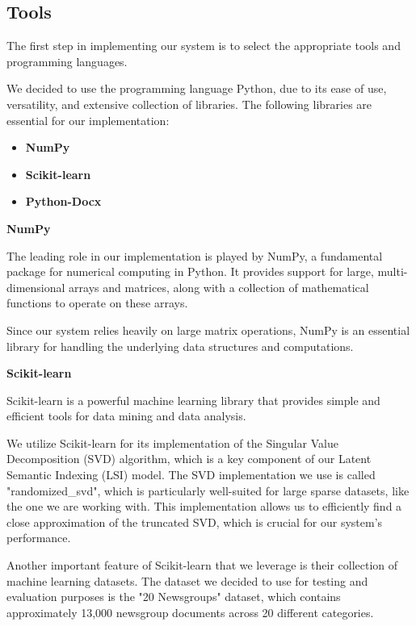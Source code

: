 \documentclass[12pt,a4paper]{article}
\begin{document}
    \subsection{Tools}
    The first step in implementing our system is to select the appropriate tools and programming languages. 
    
    We decided to use the programming language Python, due to its ease of use, versatility, and extensive collection of libraries. The following libraries are essential for our implementation:

    \begin{itemize}
        \item \textbf{NumPy}
        \item \textbf{Scikit-learn}
        \item \textbf{Python-Docx}
    \end{itemize}
        \bigskip
        \noindent
        \textbf{NumPy}

        \noindent
        The leading role in our implementation is played by NumPy, a fundamental package for numerical computing in Python. It provides support for large, multi-dimensional arrays and matrices, along with a collection of mathematical functions to operate on these arrays.

        Since our system relies heavily on large matrix operations, NumPy is an essential library for handling the underlying data structures and computations.

        \bigskip
        \noindent
        \textbf{Scikit-learn}

        \noindent
        Scikit-learn is a powerful machine learning library that provides simple and efficient tools for data mining and data analysis.
        
        We utilize Scikit-learn for its implementation of the Singular Value Decomposition (SVD) algorithm, which is a key component of our Latent Semantic Indexing (LSI) model. The SVD implementation we use is called "randomized\_svd", which is particularly well-suited for large sparse datasets, like the one we are working with. This implementation allows us to efficiently find a close approximation of the truncated SVD, which is crucial for our system's performance.

        Another important feature of Scikit-learn that we leverage is their collection of machine learning datasets. The dataset we decided to use for testing and evaluation purposes is the "20 Newsgroups" dataset, which contains approximately 13,000 newsgroup documents across 20 different categories.
\end{document}
